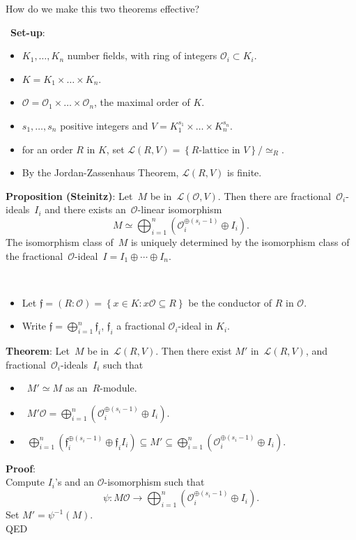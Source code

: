 \documentclass[usenames,dvipsnames]{beamer}
\newcommand{\cO}{{\mathcal O}}
\newcommand{\cL}{{\mathcal L}}
\newcommand{\frf}{{\mathfrak f}}
\newcommand{\set}[1]{\left\lbrace#1\right\rbrace }
\begin{document}
\begin{frame}
   \begin{center}
      {\large How do we make this two theorems effective?}
   \end{center}
\end{frame}

\begin{frame}{}\
   {\bf Set-up}:
   \begin{itemize}
      \item $K_1,\ldots,K_n$ number fields, with ring of integers $\cO_i\subset K_i$.
      \item $K=K_1\times \ldots \times K_n$.
      \item $\cO=\cO_1\times \ldots \times \cO_n$, the maximal order of $K$.
      \item $s_1,\ldots,s_n$ positive integers and $V = K_1^{s_1}\times \ldots\times K_n^{s_n}$.
      \item for an order $R$ in $K$, set $\cL(R,V) = \set{\text{$R$-lattice in $V$}}/\simeq_R$.
      \item By the Jordan-Zassenhaus Theorem, $\cL(R,V)$ is finite.
   \end{itemize}
   {\bf Proposition (Steinitz)}:
   Let~$M$ be in~$\cL(\cO,V)$.
   Then there are fractional~$\cO_i$-ideals~$I_i$ and there exists an~$\cO$-linear isomorphism
   \[ M\simeq
   \bigoplus_{i=1}^n \left(\cO_i^{\oplus(s_i-1)}\oplus I_i\right).
   \]
   The isomorphism class of~$M$ is uniquely determined by 
   the isomorphism class of the fractional~$\cO$-ideal~$I=I_1\oplus \cdots \oplus I_n$.
\end{frame}

\begin{frame}{}\
   \begin{itemize}
      \item Let $\frf=(R:\cO)=\set{ x \in K : x\cO \subseteq R}$ be the conductor of $R$ in $\cO$.
      \item Write $\frf=\bigoplus_{i=1}^n\frf_i$, $\frf_i$ a fractional $\cO_i$-ideal in $K_i$.
   \end{itemize}
   {\bf Theorem}:
   Let~$M$ be in~$\cL(R,V)$.
   Then there exist $M'$ in~$\cL(R,V)$, and fractional~$\cO_i$-ideals~$I_i$ such that
   \begin{itemize}
      \item~$M'\simeq M$ as an~$R$-module.
      \item~$M'\cO = \bigoplus_{i=1}^n \left(\cO_i^{\oplus(s_i-1)}\oplus I_i\right)$.
      \item~$\bigoplus_{i=1}^n \left(\frf_i^{\oplus(s_i-1)}\oplus \frf_iI_i\right) \subseteq M' \subseteq
      \bigoplus_{i=1}^n \left(\cO_i^{\oplus(s_i-1)}\oplus I_i\right)$.
   \end{itemize}
   {\bf Proof}:\\
   Compute $I_i$'s and an $\cO$-isomorphism such that 
   \[ \psi: M\cO \to \bigoplus_{i=1}^n \left(\cO_i^{\oplus(s_i-1)}\oplus I_i\right). \]
   Set $M' = \psi^{-1}(M)$.\\
   QED
\end{frame}
\end{document}
